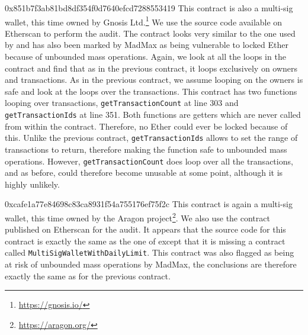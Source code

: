 \begin{investigation}{0x851b7f3ab81bd8df354f0d7640efcd7288553419}
	This contract is also a multi-sig wallet, this time owned by Gnosis Ltd.\footnote{\url{https://gnosis.io/}}
	We use the source code available on Etherscan to perform the audit.
	The contract looks very similar to the one used by  and has also been marked by MadMax as being vulnerable to locked Ether because of unbounded mass operations.
	Again, we look at all the loops in the contract and find that as in the previous contract, it loops exclusively on owners and transactions. As in the previous contract, we assume looping on the owners is safe and look at the loops over the transactions. This contract has two functions looping over transactions, \lstinline{getTransactionCount} at line 303 and \lstinline{getTransactionIds} at line 351. Both functions are getters which are never called from within the contract. Therefore, no Ether could ever be locked because of this. Unlike the previous contract, \lstinline{getTransactionIds} allows to set the range of transactions to return, therefore making the function safe to unbounded mass operations. However, \lstinline{getTransactionCount} does loop over all the transactions, and as before, could therefore become unusable at some point, although it is highly unlikely.
\end{investigation}

\begin{investigation}{0xcafe1a77e84698c83ca8931f54a755176ef75f2c}
	This contract is again a multi-sig wallet, this time owned by the Aragon project\footnote{\url{https://aragon.org/}}. We also use the contract published on Etherscan for the audit. It appears that the source code for this contract is exactly the same as the one of  except that it is missing a contract called \lstinline{MultiSigWalletWithDailyLimit}. This contract was also flagged as being at risk of unbounded mass operations by MadMax, the conclusions are therefore exactly the same as for the previous contract.
\end{investigation}

